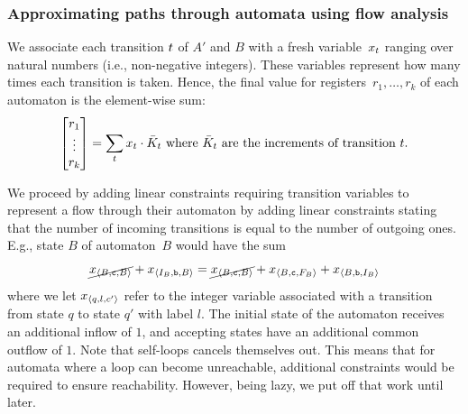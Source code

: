 \subsubsection{Approximating paths through automata using flow analysis}\label{sec:a_1}

We associate each transition $t$ of $A'$ and $B$ with a fresh
variable~$x_t$ ranging over natural numbers (i.e.,
non-negative integers).
These variables represent how many times each
transition is taken. Hence, the final value for registers~$r_1, \ldots,
r_k$ of each automaton is the element-wise sum:
\begin{equation}\label{eq:counter-sums}
\begin{bmatrix} 
  r_1 \\
  \vdots\\
  r_k \\
\end{bmatrix} = \sum_t x_t \cdot 
  \bar{K}_t \text{ where $\bar{K}_t$ are the increments of transition $t$}.
\end{equation}

We proceed by adding linear constraints requiring transition variables to
represent a flow through their automaton by adding linear constraints stating
that the number of incoming transitions is equal to the number of outgoing ones.
E.g., state $B$ of automaton~$B$ would have the sum
%
\begin{equation}\label{eq:flow-eqs}
  \cancel{x_{\left\langle B, \texttt{c}, B\right\rangle}} +
  x_{\left\langle I_B, \texttt{b}, B\right\rangle} = \cancel{x_{\left\langle B, \texttt{c}, B\right\rangle}}  +
  x_{\left\langle B, \texttt{c}, F_B\right\rangle} + x_{\left\langle B, \texttt{b}, I_B\right\rangle}
\end{equation}
%
where we let
$x_{\left\langle q, l, c'\right\rangle}$ refer to the integer variable associated with a
transition from state $q$ to state $q'$ with label $l$. The initial state
of the automaton receives an additional inflow of $1$, and accepting
states have an additional common outflow of $1$. Note that self-loops
cancels themselves out. This means that for automata where a loop can become
unreachable, additional constraints would be required to ensure reachability.
However, being lazy, we put off that work until later.


